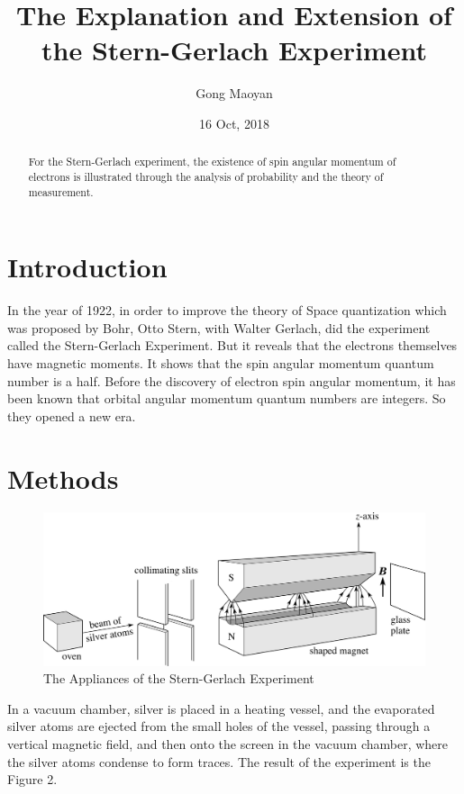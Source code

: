\documentclass[a4paper]{article}
\begin{document}
\title{The Explanation and Extension of the Stern-Gerlach Experiment}
\author{Gong Maoyan}
\date{16 Oct, 2018}
\maketitle

\begin{abstract}
For the Stern-Gerlach experiment, the existence of spin angular momentum of electrons is illustrated through the analysis of probability and the theory of measurement.

\end{abstract}

\section{Introduction}
\quad In the year of 1922, in order to improve the theory of Space quantization which was proposed by Bohr, Otto Stern, with Walter Gerlach, did the experiment called the Stern-Gerlach Experiment. But it reveals that the electrons themselves have magnetic moments. It shows that the spin angular momentum quantum number is a half. Before the discovery of electron spin angular momentum, it has been known that orbital angular momentum quantum numbers are integers. So they opened a new era.
\section{Methods}

\begin{figure}[htbp!] \label{Appliances}
\centering %
    \includegraphics[width=1.0\linewidth]{Appliances.png}
    \caption{The Appliances of the Stern-Gerlach Experiment}
\end{figure}

In a vacuum chamber, silver is placed in a heating vessel, and the evaporated silver atoms are ejected from the small holes of the vessel, passing through a vertical magnetic field, and then onto the screen in the vacuum chamber, where the silver atoms condense to form traces. The result of the experiment is the Figure 2.
\end{document}
